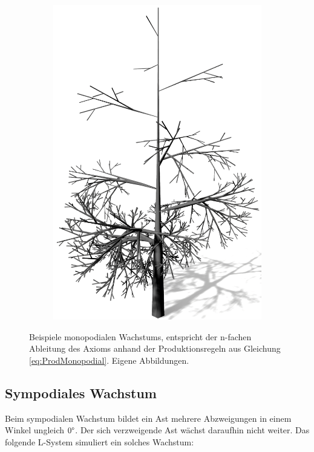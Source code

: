 \begin{figure} [hbtp]
\begin{subfigure}[t]{.45\textwidth}
		\caption{}
		\label{subfig:LS_Monopodial_3}
	\end{subfigure}
	\begin{subfigure}[t]{.45\textwidth}
		\centering
		\includegraphics[height=.21\textheight]{images/LS_Monopodial_4.png}
		\caption{}
		\label{subfig:LS_Monopodial_4}
	\end{subfigure}
	\caption{Beispiele monopodialen Wachstums, entspricht der n-fachen Ableitung des Axioms anhand der Produktionsregeln aus Gleichung \ref{eq:ProdMonopodial}. Eigene Abbildungen.}
	\label{fig:LS_Monopodial}
\end{figure}

\subsection{Sympodiales Wachstum}
Beim sympodialen Wachstum bildet ein Ast mehrere Abzweigungen in einem Winkel ungleich $0\degree$. Der sich verzweigende Ast wächst daraufhin nicht weiter. \cite[S.14]{Deussen:05} \cite[S.58]{ABOP:04} Das folgende L-System simuliert ein solches Wachstum:

